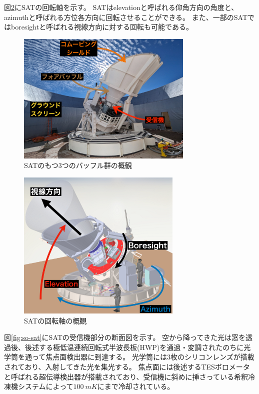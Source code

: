 \documentclass[../../main.tex]{subfiles}
\begin{document}
図\ref{fig:so-sat_angle}にSATの回転軸を示す。
SATはelevationと呼ばれる仰角方向の角度と、azimuthと呼ばれる方位各方向に回転させることができる。
また、一部のSATではboresightと呼ばれる視線方向に対する回転も可能である。
\begin{figure}[H]
    \centering
    \includegraphics[width=0.75\textwidth]{simons_observatory/sat_baffle.pdf}
    \caption{SATのもつ3つのバッフル群の概観}
    \label{fig:so-sat_baffle}
\end{figure}
\begin{figure}[H]
    \centering
    \includegraphics[width=0.7\textwidth]{simons_observatory/sat_angle.pdf}
    \caption{SATの回転軸の概観}
    \label{fig:so-sat_angle}    
\end{figure}

図\ref{fig:so-sat}にSATの受信機部分の断面図を示す。
空から降ってきた光は窓を透過後、後述する極低温連続回転式半波長板(HWP)を通過・変調されたのちに光学筒を通って焦点面検出器に到達する。
光学筒には3枚のシリコンレンズが搭載されており、入射してきた光を集光する。
焦点面には後述するTESボロメータと呼ばれる超伝導検出器が搭載されており、受信機に斜めに挿さっている希釈冷凍機システムによって$\SI{100}{mK}$にまで冷却されている\cite{galitzki2024simonsobservatorydesignintegration}。
\end{document}

